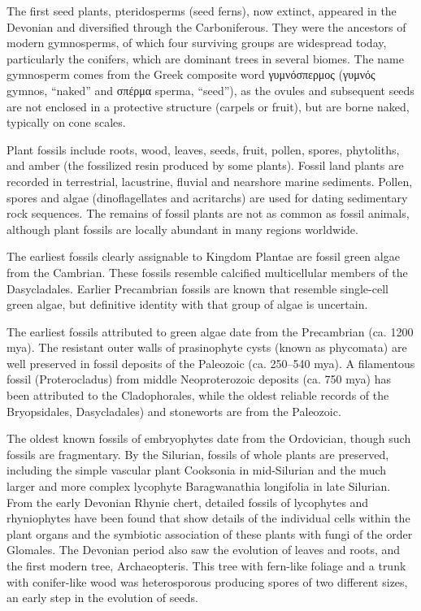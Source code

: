 The first seed plants, pteridosperms (seed ferns), now extinct, appeared in the Devonian and diversified through the Carboniferous. They were the ancestors of modern gymnosperms, of which four surviving groups are widespread today, particularly the conifers, which are dominant trees in several biomes. The name gymnosperm comes from the Greek composite word γυμνόσπερμος (γυμνός gymnos, ``naked'' and σπέρμα sperma, ``seed''), as the ovules and subsequent seeds are not enclosed in a protective structure (carpels or fruit), but are borne naked, typically on cone scales.

Plant fossils include roots, wood, leaves, seeds, fruit, pollen, spores, phytoliths, and amber (the fossilized resin produced by some plants). Fossil land plants are recorded in terrestrial, lacustrine, fluvial and nearshore marine sediments. Pollen, spores and algae (dinoflagellates and acritarchs) are used for dating sedimentary rock sequences. The remains of fossil plants are not as common as fossil animals, although plant fossils are locally abundant in many regions worldwide.

The earliest fossils clearly assignable to Kingdom Plantae are fossil green algae from the Cambrian. These fossils resemble calcified multicellular members of the Dasycladales. Earlier Precambrian fossils are known that resemble single-cell green algae, but definitive identity with that group of algae is uncertain.

The earliest fossils attributed to green algae date from the Precambrian (ca. 1200 mya). The resistant outer walls of prasinophyte cysts (known as phycomata) are well preserved in fossil deposits of the Paleozoic (ca. 250--540 mya). A filamentous fossil (Proterocladus) from middle Neoproterozoic deposits (ca. 750 mya) has been attributed to the Cladophorales, while the oldest reliable records of the Bryopsidales, Dasycladales) and stoneworts are from the Paleozoic.

The oldest known fossils of embryophytes date from the Ordovician, though such fossils are fragmentary. By the Silurian, fossils of whole plants are preserved, including the simple vascular plant Cooksonia in mid-Silurian and the much larger and more complex lycophyte Baragwanathia longifolia in late Silurian. From the early Devonian Rhynie chert, detailed fossils of lycophytes and rhyniophytes have been found that show details of the individual cells within the plant organs and the symbiotic association of these plants with fungi of the order Glomales. The Devonian period also saw the evolution of leaves and roots, and the first modern tree, Archaeopteris. This tree with fern-like foliage and a trunk with conifer-like wood was heterosporous producing spores of two different sizes, an early step in the evolution of seeds.



